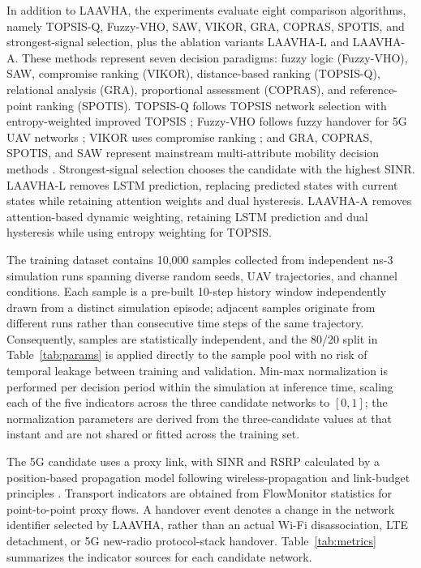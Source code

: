 \documentclass[remotesensing,article,submit,moreauthors]{Definitions/mdpi}
\begin{document}
In addition to LAAVHA, the experiments evaluate eight comparison algorithms, namely TOPSIS-Q, Fuzzy-VHO, SAW, VIKOR, GRA, COPRAS, SPOTIS, and strongest-signal selection, plus the ablation variants LAAVHA-L and LAAVHA-A. These methods represent seven decision paradigms: fuzzy logic (Fuzzy-VHO), SAW, compromise ranking (VIKOR), distance-based ranking (TOPSIS-Q), relational analysis (GRA), proportional assessment (COPRAS), and reference-point ranking (SPOTIS). TOPSIS-Q follows TOPSIS network selection with entropy-weighted improved TOPSIS \citep{ref8,ref9,ref10}; Fuzzy-VHO follows fuzzy handover for 5G UAV networks \citep{ref4}; VIKOR uses compromise ranking \citep{ref11}; and GRA, COPRAS, SPOTIS, and SAW represent mainstream multi-attribute mobility decision methods \citep{ref12}. Strongest-signal selection chooses the candidate with the highest SINR. LAAVHA-L removes LSTM prediction, replacing predicted states with current states while retaining attention weights and dual hysteresis. LAAVHA-A removes attention-based dynamic weighting, retaining LSTM prediction and dual hysteresis while using entropy weighting for TOPSIS.

The training dataset contains 10,000 samples collected from independent ns-3 simulation runs spanning diverse random seeds, UAV trajectories, and channel conditions. Each sample is a pre-built 10-step history window independently drawn from a distinct simulation episode; adjacent samples originate from different runs rather than consecutive time steps of the same trajectory. Consequently, samples are statistically independent, and the 80/20 split in Table~\ref{tab:params} is applied directly to the sample pool with no risk of temporal leakage between training and validation. Min-max normalization is performed per decision period within the simulation at inference time, scaling each of the five indicators across the three candidate networks to $[0,1]$; the normalization parameters are derived from the three-candidate values at that instant and are not shared or fitted across the training set.

The 5G candidate uses a proxy link, with SINR and RSRP calculated by a position-based propagation model following wireless-propagation and link-budget principles \citep{ref34}. Transport indicators are obtained from FlowMonitor statistics for point-to-point proxy flows. A handover event denotes a change in the network identifier selected by LAAVHA, rather than an actual Wi-Fi disassociation, LTE detachment, or 5G new-radio protocol-stack handover. Table~\ref{tab:metrics} summarizes the indicator sources for each candidate network.
\end{document}
